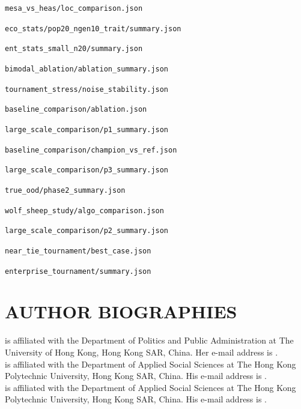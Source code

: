 \documentclass{wscpaperproc}
\begin{document}
\begin{description}\setlength{\itemsep}{0pt}\setlength{\parsep}{0pt}\small
  \item[S1] \nolinkurl{mesa_vs_heas/loc_comparison.json}
  \item[S2] \nolinkurl{eco_stats/pop20_ngen10_trait/summary.json}
  \item[S2b] \nolinkurl{ent_stats_small_n20/summary.json}
  \item[S2c] \nolinkurl{bimodal_ablation/ablation_summary.json}
  \item[S3] \nolinkurl{tournament_stress/noise_stability.json}
  \item[S4] \nolinkurl{baseline_comparison/ablation.json}
  \item[S5] \nolinkurl{large_scale_comparison/p1_summary.json}
  \item[S6a] \nolinkurl{baseline_comparison/champion_vs_ref.json}
  \item[S6b] \nolinkurl{large_scale_comparison/p3_summary.json}
  \item[S6c] \nolinkurl{true_ood/phase2_summary.json}
  \item[S7] \nolinkurl{wolf_sheep_study/algo_comparison.json}
  \item[S8] \nolinkurl{large_scale_comparison/p2_summary.json}
  \item[S9] \nolinkurl{near_tie_tournament/best_case.json}
  \item[S10] \nolinkurl{enterprise_tournament/summary.json}
\end{description}

\begingroup
\small


\endgroup

\section*{AUTHOR BIOGRAPHIES}

 is affiliated with the Department of Politics and Public Administration at The University of Hong Kong, Hong Kong SAR, China. Her e-mail address is .\\

 is affiliated with the Department of Applied Social Sciences at The Hong Kong Polytechnic University, Hong Kong SAR, China. His e-mail address is .\\

 is affiliated with the Department of Applied Social Sciences at The Hong Kong Polytechnic University, Hong Kong SAR, China. His e-mail address is .
\end{document}
